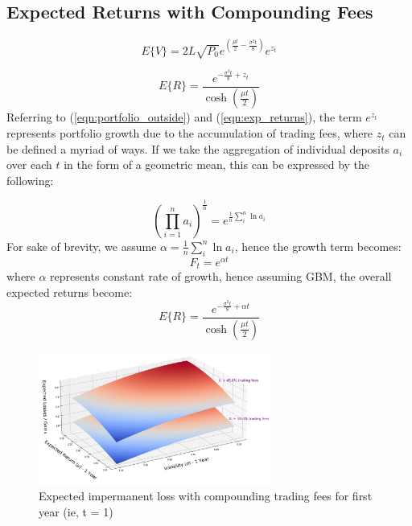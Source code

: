 \documentclass[journal,twocolumn,12pt]{ieeesyscoin}
\begin{document}
\subsection{Expected Returns with Compounding Fees}
\label{sec:exp_lp_returns}

\lipsum[1]

\begin{equation}\label{eqn:portfolio_outside}
  E\{V\} = 2 L \sqrt{P_{0}}  e^{(\frac{\mu t}{2} - \frac{\sigma^2 t}{8})}e^{z_{t}}
\end{equation}

\begin{equation}\label{eqn:exp_returns}
  E\{R\} = \frac{e^{-\frac{\sigma^2 t}{8} + z_{t}}}{\cosh (\frac{\mu t}{2})}
\end{equation}
Referring to (\ref{eqn:portfolio_outside}) and (\ref{eqn:exp_returns}), the term $e^{z_{t}}$ represents portfolio growth due to the accumulation of trading fees, where $z_{t}$ can be defined a myriad of ways. If we take the aggregation of individual deposits $a_{i}$ over each $t$ in the form of a geometric mean, this can be expressed by the following:

\begin{equation}\label{eqn:geo_mean}
  (\prod_{i=1}^{n}a_{i})^{\frac{1}{n}} = e^{\frac{1}{n}\sum_{i}^{n}\ln a_{i}}
\end{equation}
For sake of brevity, we assume $\alpha = \frac{1}{n}\sum_{i}^{n}\ln a_{i}$, hence the growth term becomes:
\begin{equation}\label{eqn:geo_mean}
  F_{t} = e^{\alpha t}
\end{equation}
where $\alpha$ represents constant rate of growth, hence assuming GBM, the overall expected returns become:
\begin{equation}\label{eqn:exp_returns}
  E\{R\} = \frac{e^{-\frac{\sigma^2 t}{8} + \alpha t}}{\cosh (\frac{\mu t}{2})}
\end{equation}

\begin{figure}[h!]
\includegraphics[width=3in]{img/imp_loss_compounding_fees.png}
\caption{Expected impermanent loss with compounding trading fees for first year (ie, t = 1)} 
\label{fig:daosys_protocol}
\end{figure}
\end{document}

